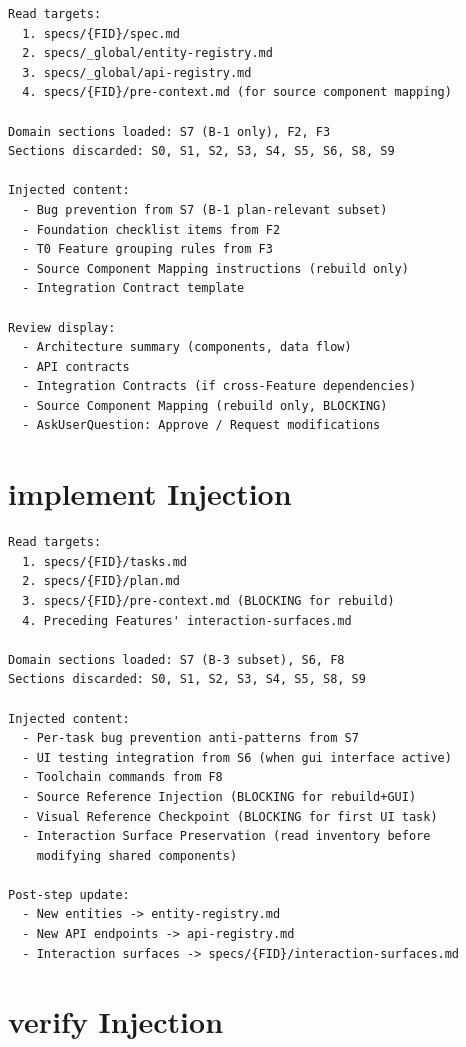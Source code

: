 \documentclass[11pt,a4paper,openright,twoside]{report}
\begin{document}
\begin{lstlisting}[title={plan Context Assembly}]
Read targets:
  1. specs/{FID}/spec.md
  2. specs/_global/entity-registry.md
  3. specs/_global/api-registry.md
  4. specs/{FID}/pre-context.md (for source component mapping)

Domain sections loaded: S7 (B-1 only), F2, F3
Sections discarded: S0, S1, S2, S3, S4, S5, S6, S8, S9

Injected content:
  - Bug prevention from S7 (B-1 plan-relevant subset)
  - Foundation checklist items from F2
  - T0 Feature grouping rules from F3
  - Source Component Mapping instructions (rebuild only)
  - Integration Contract template

Review display:
  - Architecture summary (components, data flow)
  - API contracts
  - Integration Contracts (if cross-Feature dependencies)
  - Source Component Mapping (rebuild only, BLOCKING)
  - AskUserQuestion: Approve / Request modifications
\end{lstlisting}

\section{implement Injection}

\begin{lstlisting}[title={implement Context Assembly}]
Read targets:
  1. specs/{FID}/tasks.md
  2. specs/{FID}/plan.md
  3. specs/{FID}/pre-context.md (BLOCKING for rebuild)
  4. Preceding Features' interaction-surfaces.md

Domain sections loaded: S7 (B-3 subset), S6, F8
Sections discarded: S0, S1, S2, S3, S4, S5, S8, S9

Injected content:
  - Per-task bug prevention anti-patterns from S7
  - UI testing integration from S6 (when gui interface active)
  - Toolchain commands from F8
  - Source Reference Injection (BLOCKING for rebuild+GUI)
  - Visual Reference Checkpoint (BLOCKING for first UI task)
  - Interaction Surface Preservation (read inventory before
    modifying shared components)

Post-step update:
  - New entities -> entity-registry.md
  - New API endpoints -> api-registry.md
  - Interaction surfaces -> specs/{FID}/interaction-surfaces.md
\end{lstlisting}

\section{verify Injection}
\end{document}
